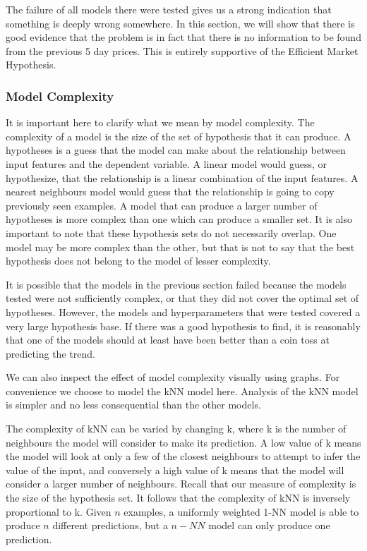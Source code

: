 \documentclass{report}
\begin{document}
The failure of all models there were tested gives us a strong indication that something is deeply wrong somewhere. In this section, we will show that there is good evidence that the problem is in fact that there is no information to be found from the previous 5 day prices. This is entirely supportive of the Efficient Market Hypothesis.

\subsubsection{Model Complexity}

It is important here to clarify what we mean by model complexity. The complexity of a model is the size of the set of hypothesis that it can produce. A hypotheses is a guess that the model can make about the relationship between input features and the dependent variable. A linear model would guess, or hypothesize, that the relationship is a linear combination of the input features. A nearest neighbours model would guess that the relationship is going to copy previously seen examples. A model that can produce a larger number of hypotheses is more complex than one which can produce a smaller set. It is also important to note that these hypothesis sets do not necessarily overlap. One model may be more complex than the other, but that is not to say that the best hypothesis does not belong to the model of lesser complexity.



It is possible that the models in the previous section failed because the models tested were not sufficiently complex, or that they did not cover the optimal set of hypotheses. However, the models and hyperparameters that were tested covered a very large hypothesis base. If there was a good hypothesis to find, it is reasonably that one of the models should at least have been better than a coin toss at predicting the trend. 

We can also inspect the effect of model complexity visually using graphs. For convenience we choose to model the kNN model here. Analysis of the kNN model is simpler and no less consequential than the other models.

The complexity of kNN can be varied by changing k, where k is the number of neighbours the model will consider to make its prediction. A low value of k means the model will look at only a few of the closest neighbours to attempt to infer the value of the input, and conversely a high value of k means that the model will consider a larger number of neighbours. Recall that our measure of complexity is the size of the hypothesis set. It follows that the complexity of kNN is inversely proportional to k. Given $n$ examples, a uniformly weighted 1-NN model is able to produce $n$ different predictions, but a $n-NN$ model can only produce one prediction.
\end{document}
